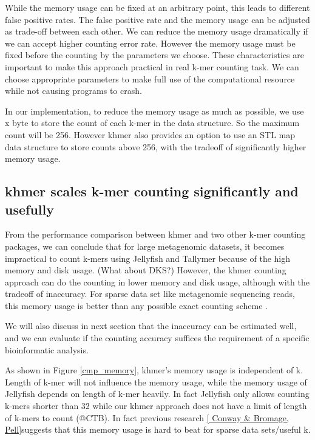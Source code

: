 \documentclass{article}
\begin{document}
While the memory usage can be fixed at an arbitrary point, this leads
to different false positive rates.  The false positive rate and the
memory usage can be adjusted as trade-off between each other.  We can
reduce the memory usage dramatically if we can accept higher counting
error rate. However the memory usage must be fixed before the counting
by the parameters we choose. These characteristics are important to
make this approach practical in real k-mer counting task. We can
choose appropriate parameters to make full use of the computational
resource while not causing programs to crash.

In our implementation, to reduce the memory usage as much as possible,
we use x byte to store the count of each k-mer in the data
structure. So the maximum count will be 256.  However khmer also
provides an option to use an STL map data structure to store counts
above 256, with the tradeoff of significantly higher memory usage.

\subsection{khmer scales k-mer counting significantly and usefully}

From the performance comparison between khmer and two other k-mer
counting packages, we can conclude that for large metagenomic
datasets, it becomes impractical to count k-mers using Jellyfish and
Tallymer because of the high memory and disk usage.  (What about DKS?)
However, the khmer counting approach can do the counting in lower
memory and disk usage, although with the tradeoff of inaccuracy. For
sparse data set like metagenomic sequencing reads, this memory usage
is better than any possible exact counting scheme \cite{Pell2012}.

We will also discuss in next section that the inaccuracy can be
estimated well, and we can evaluate if the counting accuracy suffices
the requirement of a specific bioinformatic analysis.

As shown in Figure \ref{cmp_memory}, khmer's memory usage is
independent of k. Length of k-mer will not influence the memory usage,
while the memory usage of Jellyfish depends on length of k-mer
heavily. In fact Jellyfish only allows counting k-mers shorter than 32
while our khmer approach does not have a limit of length of k-mers to
count (@CTB).  In fact previous research \ref{ Conway & Bromage,
  Pell}suggests that this memory usage is hard to beat for sparse data
sets/useful k.
\end{document}
